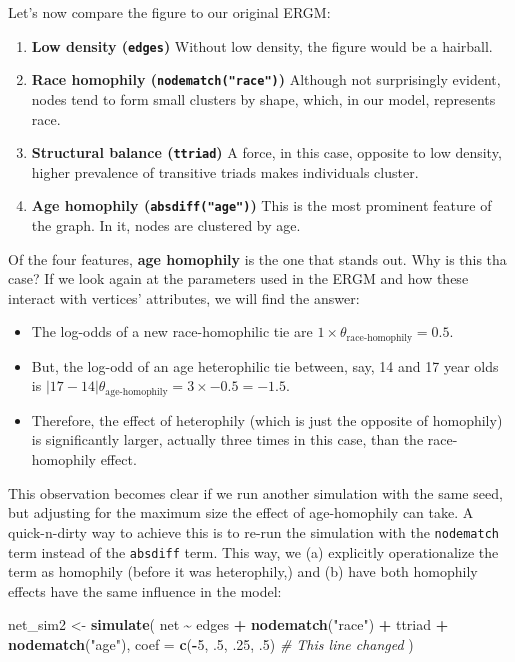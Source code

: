 \documentclass[
]{book}
\newenvironment{Shaded}{\begin{snugshade}}{\end{snugshade}}
\newcommand{\AttributeTok}[1]{\textcolor[rgb]{0.13,0.29,0.53}{#1}}
\newcommand{\CommentTok}[1]{\textcolor[rgb]{0.56,0.35,0.01}{\textit{#1}}}
\newcommand{\DecValTok}[1]{\textcolor[rgb]{0.00,0.00,0.81}{#1}}
\newcommand{\FunctionTok}[1]{\textcolor[rgb]{0.13,0.29,0.53}{\textbf{#1}}}
\newcommand{\NormalTok}[1]{#1}
\newcommand{\OtherTok}[1]{\textcolor[rgb]{0.56,0.35,0.01}{#1}}
\newcommand{\SpecialCharTok}[1]{\textcolor[rgb]{0.81,0.36,0.00}{\textbf{#1}}}
\newcommand{\StringTok}[1]{\textcolor[rgb]{0.31,0.60,0.02}{#1}}
\begin{document}
Let's now compare the figure to our original ERGM:

\begin{enumerate}
\def\labelenumi{\arabic{enumi}.}
\item
  \textbf{Low density (\texttt{edges})} Without low density, the figure would be
  a hairball.
\item
  \textbf{Race homophily (\texttt{nodematch("race")})} Although not surprisingly evident,
  nodes tend to form small clusters by shape, which, in our model, represents
  race.
\item
  \textbf{Structural balance (\texttt{ttriad})} A force, in this case, opposite to low
  density, higher prevalence of transitive triads makes individuals cluster.
\item
  \textbf{Age homophily (\texttt{absdiff("age")})} This is the most prominent feature of
  the graph. In it, nodes are clustered by age.
\end{enumerate}

Of the four features, \textbf{age homophily} is the one that stands out. Why is this
tha case? If we look again at the parameters used in the ERGM and how these
interact with vertices' attributes, we will find the answer:

\begin{itemize}
\item
  The log-odds of a new race-homophilic tie are \(1\times\theta_{\mbox{race-homophily}} = 0.5\).
\item
  But, the log-odd of an age heterophilic tie between, say, 14 and 17 year
  olds is \(|17-14|\theta_{\mbox{age-homophily}} = 3\times -0.5 = -1.5\).
\item
  Therefore, the effect of heterophily (which is just the opposite of homophily)
  is significantly larger, actually three times in this case, than the race-homophily
  effect.
\end{itemize}

This observation becomes clear if we run another simulation with the same seed, but
adjusting for the maximum size the effect of age-homophily can take. A
quick-n-dirty way to achieve this is to re-run the simulation with the \texttt{nodematch}
term instead of the \texttt{absdiff} term. This way, we (a) explicitly operationalize
the term as homophily (before it was heterophily,) and (b) have both homophily
effects have the same influence in the model:

\begin{Shaded}
\begin{Highlighting}[]
\NormalTok{net\_sim2 }\OtherTok{\textless{}{-}} \FunctionTok{simulate}\NormalTok{(}
\NormalTok{    net }\SpecialCharTok{\textasciitilde{}}\NormalTok{ edges }\SpecialCharTok{+}
    \FunctionTok{nodematch}\NormalTok{(}\StringTok{"race"}\NormalTok{) }\SpecialCharTok{+}
\NormalTok{    ttriad }\SpecialCharTok{+}
    \FunctionTok{nodematch}\NormalTok{(}\StringTok{"age"}\NormalTok{),}
    \AttributeTok{coef =} \FunctionTok{c}\NormalTok{(}\SpecialCharTok{{-}}\DecValTok{5}\NormalTok{, .}\DecValTok{5}\NormalTok{, .}\DecValTok{25}\NormalTok{, .}\DecValTok{5}\NormalTok{) }\CommentTok{\# This line changed}
\NormalTok{    )}
\end{Highlighting}
\end{Shaded}
\end{document}
